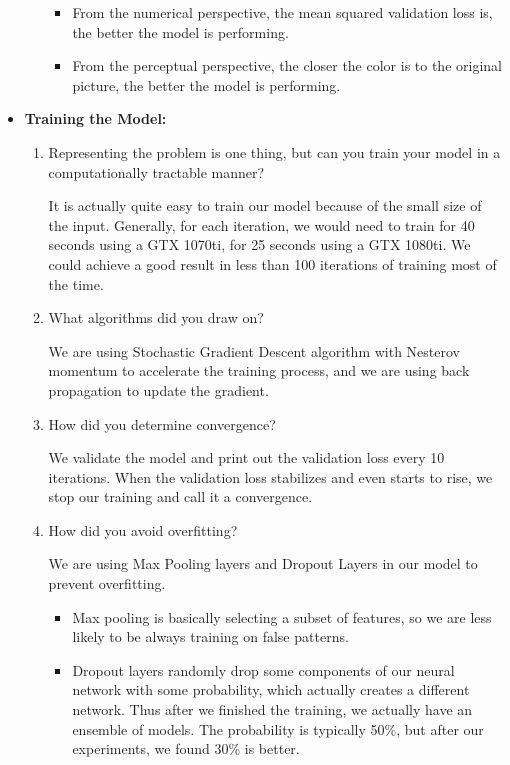 \documentclass[letter]{article}
\begin{document}
\begin{itemize}
\begin{enumerate}
		\begin{itemize}
			\item {From the numerical perspective, the mean squared validation loss is, the better the model is performing. }
			\item {From the perceptual perspective, the closer the color is to the original picture, the better the model is performing.}
		\end{itemize}
	\end{enumerate}
	\item {\textbf{Training the Model:}} 
	\begin{enumerate}
		\item{Representing the problem is one thing, but can you train your model in a computationally tractable manner?}
		\par{It is actually quite easy to train our model because of the small size of the input. Generally, for each iteration, we would need to train for 40 seconds using a GTX 1070ti, for 25 seconds using a GTX 1080ti. We could achieve a good result in less than 100 iterations of training most of the time.}
		\item{What algorithms did you draw on?}
		\par{We are using Stochastic Gradient Descent algorithm with Nesterov momentum to accelerate the training process, and we are using back propagation to update the gradient.}
		\item{How did you determine convergence?}
		\par{We validate the model and print out the validation loss every 10 iterations. When the validation loss stabilizes and even starts to rise, we stop our training and call it a convergence.}
		\item{How did you avoid overfitting?}
		\par{We are using Max Pooling layers and Dropout Layers in our model to prevent overfitting.}
		\begin{itemize}
			\item {Max pooling is basically selecting a subset of features, so we are less likely to be always training on false patterns.}
			\item {Dropout layers randomly drop some components of our neural network with some probability, which actually creates a different network. Thus after we finished the training, we actually have an ensemble of models. The probability is typically 50\%, but after our experiments, we found 30\% is better.}
		\end{itemize}

\end{enumerate}
\end{itemize}
\end{document}
